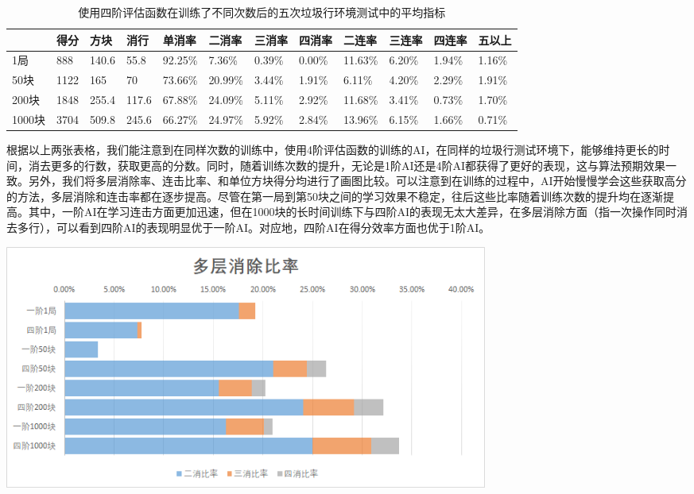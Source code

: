 \documentclass[10pt,UTF8]{article}
\newenvironment{Figure}
  {\par\medskip\noindent\minipage{\linewidth}}
  {\endminipage\par\medskip}
\begin{document}
\begin{table}[h]
    \centering
    \caption{使用四阶评估函数在训练了不同次数后的五次垃圾行环境测试中的平均指标}
    \begin{tabular}{@{}llllllllllll@{}}
    \toprule
          & 得分   & 方块    & 消行    & 单消率     & 二消率     & 三消率    & 四消率    & 二连率     & 三连率    & 四连率    & 五以上    \\ \midrule
    1局    & 888  & 140.6 & 55.8  & 92.25\% & 7.36\%  & 0.39\% & 0.00\% & 11.63\% & 6.20\% & 1.94\% & 1.16\% \\
    50块   & 1122 & 165   & 70    & 73.66\% & 20.99\% & 3.44\% & 1.91\% & 6.11\%  & 4.20\% & 2.29\% & 1.91\% \\
    200块  & 1848 & 255.4 & 117.6 & 67.88\% & 24.09\% & 5.11\% & 2.92\% & 11.68\% & 3.41\% & 0.73\% & 1.70\% \\
    1000块 & 3704 & 509.8 & 245.6 & 66.27\% & 24.97\% & 5.92\% & 2.84\% & 13.96\% & 6.15\% & 1.66\% & 0.71\% \\ \bottomrule
    \end{tabular}
    \end{table}

\begin{multicols}{2}

根据以上两张表格，我们能注意到在同样次数的训练中，使用4阶评估函数的训练的AI，在同样的垃圾行测试环境下，能够维持更长的时间，消去更多的行数，获取更高的分数。同时，随着训练次数的提升，无论是1阶AI还是4阶AI都获得了更好的表现，这与算法预期效果一致。另外，我们将多层消除率、连击比率、和单位方块得分均进行了画图比较。可以注意到在训练的过程中，AI开始慢慢学会这些获取高分的方法，多层消除和连击率都在逐步提高。尽管在第一局到第50块之间的学习效果不稳定，往后这些比率随着训练次数的提升均在逐渐提高。其中，一阶AI在学习连击方面更加迅速，但在1000块的长时间训练下与四阶AI的表现无太大差异，在多层消除方面（指一次操作同时消去多行），可以看到四阶AI的表现明显优于一阶AI。对应地，四阶AI在得分效率方面也优于1阶AI。

\end{multicols}

\begin{Figure}
    \centering
    \includegraphics[width=0.7\textwidth]{figure/result1.png}
\end{Figure}
\end{document}
